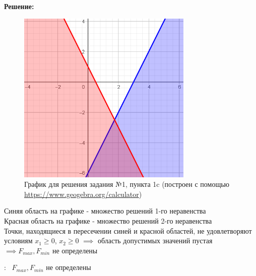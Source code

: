 \begin{center}
    {\bf
    Решение:}
\end{center}

\begin{figure}[ht]
\centering
\includegraphics[]{пункт с.png}
\centering
\caption{График для решения задания №1, пункта 1c (построен с помощью \url{https://www.geogebra.org/calculator})}
\end{figure}


\begin{flushleft}
    Синяя область на графике - множество решений 1-го неравенства\\
    Красная область на графике - множество решений 2-го неравенства\\
    Точки, находящиеся в пересечении синей и красной областей, не удовлетворяют условиям $x_1 \ge 0$, $x_2 \ge 0$ $\implies$ область допустимых значений пустая $\implies F_{max}, F_{min}$ не определены
\end{flushleft}

{:~} $F_{max}, F_{min}$ не определены
